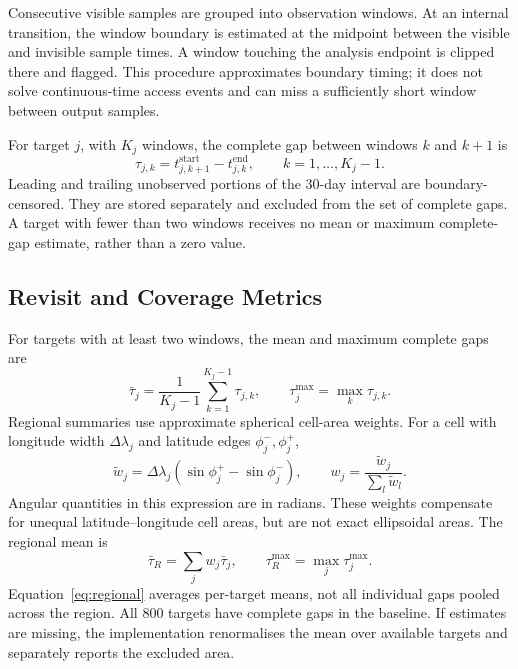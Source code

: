 \documentclass[conf]{new-aiaa}
\begin{document}
Consecutive visible samples are grouped into observation windows. At an
internal transition, the window boundary is estimated at the midpoint
between the visible and invisible sample times. A window touching the
analysis endpoint is clipped there and flagged. This procedure approximates
boundary timing; it does not solve continuous-time access events and can
miss a sufficiently short window between output samples.

For target $j$, with $K_j$ windows, the complete gap between windows $k$ and
$k+1$ is
\begin{equation}
\tau_{j,k}=t^{\mathrm{start}}_{j,k+1}-t^{\mathrm{end}}_{j,k},
\qquad k=1,\ldots,K_j-1.
\label{eq:gap}
\end{equation}
Leading and trailing unobserved portions of the 30-day interval are
boundary-censored. They are stored separately and excluded from the set of
complete gaps. A target with fewer than two windows receives no mean or
maximum complete-gap estimate, rather than a zero value.

\subsection{Revisit and Coverage Metrics}
For targets with at least two windows, the mean and maximum complete gaps are
\begin{equation}
\bar{\tau}_j=\frac{1}{K_j-1}\sum_{k=1}^{K_j-1}\tau_{j,k},\qquad
\tau^{\max}_j=\max_k\tau_{j,k}.
\end{equation}
Regional summaries use approximate spherical cell-area weights. For a cell
with longitude width $\Delta\lambda_j$ and latitude edges
$\phi_j^-,\phi_j^+$,
\begin{equation}
\widetilde{w}_j=\Delta\lambda_j(\sin\phi_j^+-\sin\phi_j^-),\qquad
w_j=\frac{\widetilde{w}_j}{\sum_l\widetilde{w}_l}.
\end{equation}
Angular quantities in this expression are in radians. These weights
compensate for unequal latitude--longitude cell areas, but are not exact
ellipsoidal areas. The regional mean is
\begin{equation}
\bar{\tau}_{R}=\sum_j w_j\bar{\tau}_j,
\qquad \tau_R^{\max}=\max_j\tau_j^{\max}.
\label{eq:regional}
\end{equation}
Equation~\eqref{eq:regional} averages per-target means, not all individual
gaps pooled across the region. All 800 targets have complete gaps in the
baseline. If estimates are missing, the implementation renormalises the
mean over available targets and separately reports the excluded area.
\end{document}
